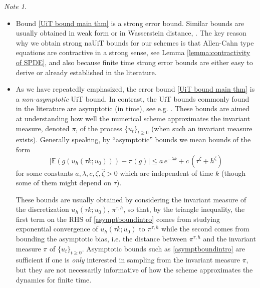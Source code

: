 \documentclass[reqno, 11pt]{amsart}
\theoremstyle{plain}
\theoremstyle{definition}
\theoremstyle{remark}
\newtheorem{note}[theorem]{Note}
\numberwithin{equation}{section}
\numberwithin{theorem}{section}
\begin{document}
{\begin{note}
\begin{itemize}
{The uniform in time bound \ref{Uniform in time moment bound} on the numerical scheme  usually requires an approach tailored to the specific dynamics. Despite the difficulties highlighted so far in proving the conditions required to apply Theorem \ref{thm: UiT theorem in our case},   it is also true that the literature is mature enough that, in some cases, many of the estimates are readily available. This will be the case for one of the schemes we study here, see Subsection \ref{subsec:truncated tamed} on this point.} 

\item Bound \eqref{UiT bound main thm} is a strong error bound. Similar bounds are usually obtained in weak form or in Wasserstein distance, \cite{glatt2024long, Angeli, crisan2021uniform, schuh2024conditions}. The key reason why we obtain strong naUiT bounds for our schemes is that Allen-Cahn type equations are contractive in a strong sense, see Lemma \ref{lemma:contractivity of SPDE}, and also because finite time strong error bounds are either easy to derive or already established in the literature. 

\item As we have repeatedly emphasized, the error bound \eqref{UiT bound main thm} is a {\em non-asymptotic} UiT bound.  In contrast, the UiT bounds commonly found in the literature are asymptotic (in time), see e.g. \cite{mattingly2002ergodicity, bou2023mixing, schuh2024convergence, duncan2017using, brehier2014approximation, cui2021weak}.  These bounds are aimed at understanding how well the numerical scheme approximates the invariant measure, denoted $\pi$, of the process $\{u_t\}_{t\geq 0}$ (when such an invariant measure exists).   Generally speaking, by ``asymptotic'' bounds we mean bounds of the form  
\begin{equation}\label{asymptboundintro}
\left|  \mathbb E\left(g\left( u_h(\tau k; u_0)\right)\right) - \pi(g)  \right| \leq a\,  e^{-\lambda k} + c \,  (\tau^{\hat \zeta} + h^{\zeta})
\end{equation}
for some constants  $a, \lambda, c, \zeta, \hat \zeta>0$ which are independent of time $k$ (though some of them might depend on $\tau$).  

These bounds are usually obtained by considering the invariant measure of the discretization $u_h(\tau k; u_0)$, $\pi^{\tau, h}$,  so that, by the triangle inequality, the first term on the RHS of \eqref{asymptboundintro} comes from studying exponential convergence of $u_h(\tau k; u_0)$ to  $\pi^{\tau,h}$ while the second comes from bounding the asymptotic bias, i.e. the distance between $\pi^{\tau, h}$ and the invariant measure $\pi$ of $\{u_t\}_{t\geq 0}$. Asymptotic bounds such as \eqref{asymptboundintro} are sufficient if one is {\em only} interested in sampling from the invariant measure $\pi$, but they are not necessarily informative of how the scheme approximates the dynamics for finite time. 



\end{itemize}
\end{note}}
\end{document}
